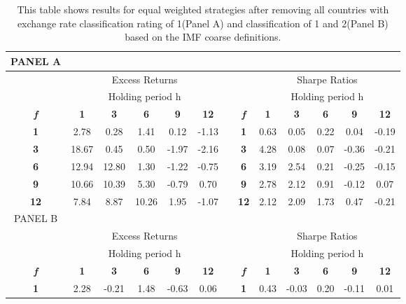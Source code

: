\documentclass{article}
\begin{document}
\begin{table}[htb!]
  \centering
  \caption{This table shows results for equal weighted strategies after removing all countries with exchange rate classification rating of 1(Panel A) and classification of 1 and 2(Panel B) based on the IMF coarse definitions.}
    \begin{tabular}{ccccccccccccc}
    \toprule
    PANEL A
    \\
    \hline
          & \multicolumn{5}{c}{Excess Returns}    &       &       & \multicolumn{5}{c}{Sharpe Ratios} \\
\cmidrule{2-6}\cmidrule{9-13}          & \multicolumn{5}{c}{Holding period h}  &       &       & \multicolumn{5}{c}{Holding period h} \\
    \textit{\textbf{f}} & \textbf{1} & \textbf{3} & \textbf{6} & \textbf{9} & \textbf{12} &       & \textit{\textbf{f}} & \textbf{1} & \textbf{3} & \textbf{6} & \textbf{9} & \textbf{12} \\
\cmidrule{2-6}\cmidrule{9-13}    \textbf{1} & 2.78  & 0.28  & 1.41  & 0.12  & -1.13 &       & \textbf{1} & 0.63  & 0.05  & 0.22  & 0.04  & -0.19 \\
    \textbf{3} & 18.67 & 0.45  & 0.50  & -1.97 & -2.16 &       & \textbf{3} & 4.28  & 0.08  & 0.07  & -0.36 & -0.21 \\
    \textbf{6} & 12.94 & 12.80 & 1.30  & -1.22 & -0.75 &       & \textbf{6} & 3.19  & 2.54  & 0.21  & -0.25 & -0.15 \\
    \textbf{9} & 10.66 & 10.39 & 5.30  & -0.79 & 0.70  &       & \textbf{9} & 2.78  & 2.12  & 0.91  & -0.12 & 0.07 \\
    \textbf{12} & 7.84  & 8.87  & 10.26 & 1.95  & -1.07 &       & \textbf{12} & 2.12  & 2.09  & 1.73  & 0.47  & -0.21 \\
    \midrule
    PANEL B\\
    \hline
          & \multicolumn{5}{c}{Excess Returns}    &       &       & \multicolumn{5}{c}{Sharpe Ratios} \\
\cmidrule{2-6}\cmidrule{9-13}          & \multicolumn{5}{c}{Holding period h}  &       &       & \multicolumn{5}{c}{Holding period h} \\
    \textit{\textbf{f}} & \textbf{1} & \textbf{3} & \textbf{6} & \textbf{9} & \textbf{12} &       & \textit{\textbf{f}} & \textbf{1} & \textbf{3} & \textbf{6} & \textbf{9} & \textbf{12} \\
\cmidrule{2-6}\cmidrule{9-13}    \textbf{1} & 2.28  & -0.21 & 1.48  & -0.63 & 0.06  &       & \textbf{1} & 0.43  & -0.03 & 0.20  & -0.11 & 0.01 \\

\end{tabular}
\end{table}
\end{document}
